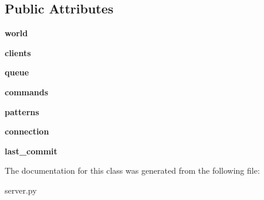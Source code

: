 \subsection*{Public Attributes}
\begin{DoxyCompactItemize}
\item 
\mbox{\label{classserver_1_1Model_a6107594ebcdc6ff20794651a2f12e5b7}} 
{\bfseries world}
\item 
\mbox{\label{classserver_1_1Model_ae8aefbf418082334aba83df648f7597e}} 
{\bfseries clients}
\item 
\mbox{\label{classserver_1_1Model_a65c1208dbbe27fc4c2ebf9dbb465e8b2}} 
{\bfseries queue}
\item 
\mbox{\label{classserver_1_1Model_a9cc9e8300304ed383f576d97b357b074}} 
{\bfseries commands}
\item 
\mbox{\label{classserver_1_1Model_a44f6ce8a304b6e72d5bbe4bcbd6795db}} 
{\bfseries patterns}
\item 
\mbox{\label{classserver_1_1Model_afb3cee7bcfdd6157b3607d823ab5145e}} 
{\bfseries connection}
\item 
\mbox{\label{classserver_1_1Model_af17091b5639b2ea262bf50746c532dd6}} 
{\bfseries last\+\_\+commit}
\end{DoxyCompactItemize}


The documentation for this class was generated from the following file\+:\begin{DoxyCompactItemize}
\item 
server.\+py\end{DoxyCompactItemize}

